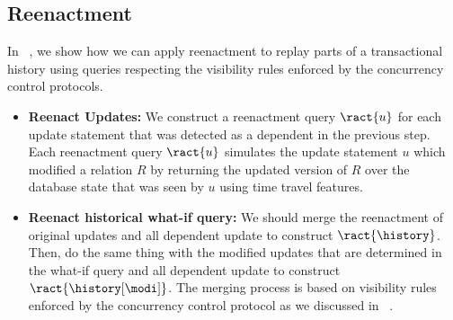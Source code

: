 \subsection{Reenactment}
\label{sec:reenactment}
In ~\cite{AG14,AG16,AG17}, we show how we can apply reenactment to replay parts of a transactional history using queries respecting the visibility rules enforced by the concurrency control protocols.
\begin{itemize}
\item \textbf{Reenact Updates:} We construct a reenactment query $\ract{u}$ for each update statement that was detected as a dependent in the previous step. Each reenactment query $\ract{u}$ simulates the update statement $u$ which modified a relation $R$ by returning the updated version of $R$ over the database state that was seen by $u$ using time travel features.
\item \textbf{Reenact historical what-if query:} We should merge the reenactment of original updates and all dependent update to construct $\ract{\history}$. Then, do the same thing with the modified updates that are determined in the what-if query and all dependent update to construct $\ract{\history[\modi]}$. The merging process is based on visibility rules enforced by the concurrency control protocol as we discussed in ~\cite{AG16,AG17}.
\end{itemize}

